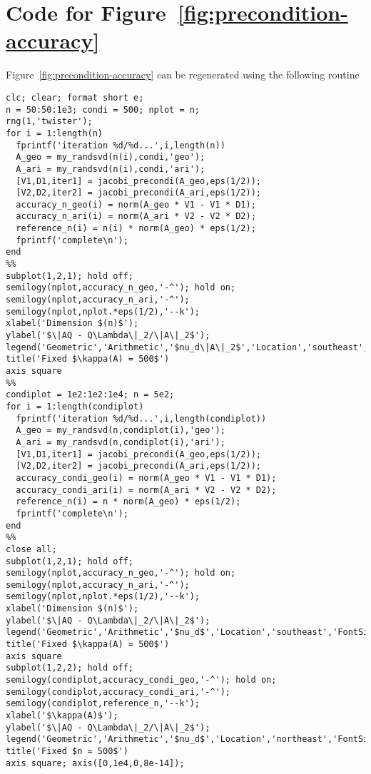 \section{Code for Figure~\ref{fig:precondition-accuracy} }\label{app:precondition-accuracy}
Figure~\ref{fig:precondition-accuracy} can be regenerated using the following routine 
\begin{lstlisting}
clc; clear; format short e;
n = 50:50:1e3; condi = 500; nplot = n;
rng(1,'twister');
for i = 1:length(n)
  fprintf('iteration %d/%d...',i,length(n))
  A_geo = my_randsvd(n(i),condi,'geo');
  A_ari = my_randsvd(n(i),condi,'ari');
  [V1,D1,iter1] = jacobi_precondi(A_geo,eps(1/2));
  [V2,D2,iter2] = jacobi_precondi(A_ari,eps(1/2));
  accuracy_n_geo(i) = norm(A_geo * V1 - V1 * D1);
  accuracy_n_ari(i) = norm(A_ari * V2 - V2 * D2);
  reference_n(i) = n(i) * norm(A_geo) * eps(1/2);
  fprintf('complete\n');
end
%%
subplot(1,2,1); hold off;
semilogy(nplot,accuracy_n_geo,'-^'); hold on;
semilogy(nplot,accuracy_n_ari,'-^');
semilogy(nplot,nplot.*eps(1/2),'--k');
xlabel('Dimension $(n)$'); 
ylabel('$\|AQ - Q\Lambda\|_2/\|A\|_2$');
legend('Geometric','Arithmetic','$nu_d\|A\|_2$','Location','southeast','FontSize',20);
title('Fixed $\kappa(A) = 500$')
axis square
%%
condiplot = 1e2:1e2:1e4; n = 5e2;
for i = 1:length(condiplot)
  fprintf('iteration %d/%d...',i,length(condiplot))
  A_geo = my_randsvd(n,condiplot(i),'geo');
  A_ari = my_randsvd(n,condiplot(i),'ari');
  [V1,D1,iter1] = jacobi_precondi(A_geo,eps(1/2));
  [V2,D2,iter2] = jacobi_precondi(A_ari,eps(1/2));
  accuracy_condi_geo(i) = norm(A_geo * V1 - V1 * D1);
  accuracy_condi_ari(i) = norm(A_ari * V2 - V2 * D2);
  reference_n(i) = n * norm(A_geo) * eps(1/2);
  fprintf('complete\n');
end
%%
close all;
subplot(1,2,1); hold off;
semilogy(nplot,accuracy_n_geo,'-^'); hold on;
semilogy(nplot,accuracy_n_ari,'-^');
semilogy(nplot,nplot.*eps(1/2),'--k');
xlabel('Dimension $(n)$'); 
ylabel('$\|AQ - Q\Lambda\|_2/\|A\|_2$');
legend('Geometric','Arithmetic','$nu_d$','Location','southeast','FontSize',20);
title('Fixed $\kappa(A) = 500$')
axis square
subplot(1,2,2); hold off;
semilogy(condiplot,accuracy_condi_geo,'-^'); hold on;
semilogy(condiplot,accuracy_condi_ari,'-^');
semilogy(condiplot,reference_n,'--k'); 
xlabel('$\kappa(A)$'); 
ylabel('$\|AQ - Q\Lambda\|_2/\|A\|_2$');
legend('Geometric','Arithmetic','$nu_d$','Location','northeast','FontSize',20);
title('Fixed $n = 500$')
axis square; axis([0,1e4,0,8e-14]);
\end{lstlisting}

